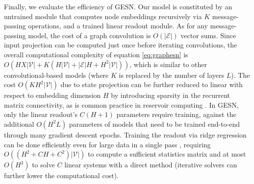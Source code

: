 \documentclass[final,5p,times,twocolumn]{elsarticle}
\begin{document}
Finally, we evaluate the efficiency of GESN.
Our model is constituted by an untrained module that computes node embeddings recursively via $K$ message-passing operations, and a trained linear readout module.
As for any message-passing model, the cost of a graph convolution is $O(|\mathcal{E}|)$ vector sums.
Since input projection can be computed just once before iterating convolutions, the overall computational complexity of equation \eqref{eq:graphesn} is $O\left(H X |\mathcal{V}| + K (H |\mathcal{V}| + |\mathcal{E}| H + H^2 |\mathcal{V}|)\right)$, which is similar to other convolutional-based models (where $K$ is replaced by the number of layers $L$).
The cost $O(K H^2 |\mathcal{V}|)$ due to state projection can be further reduced to linear with respect to embedding dimension $H$ by introducing sparsity in the recurrent matrix connectivity, as is common practice in reservoir computing \cite{Gallicchio2020}.
In GESN, only the linear readout's $C (H+1)$ parameters require training, against the additional $O(H^2 L)$ parameters of models that need to be trained end-to-end through many gradient descent epochs.
Training the readout via ridge regression can be done efficiently even for large data in a single pass \cite{Zhang2017}, requiring $O\left((H^2 + C H + C^2) |\mathcal{V}|\right)$ to compute a sufficient statistics matrix and at most $O(H^3)$ to solve $C$ linear systems with a direct method (iterative solvers can further lower the computational cost).
\end{document}
